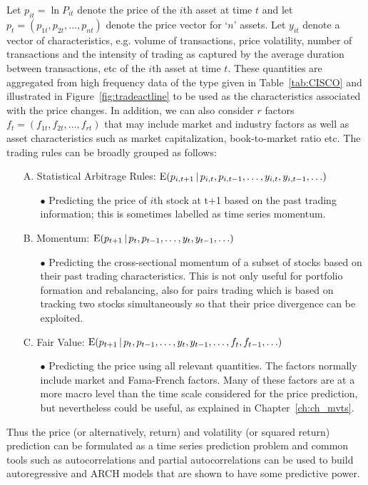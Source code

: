 Let $p_{it}= \ln P_{it}$ denote the price of the $i$th asset at time $t$ and let $p_t = (p_{1t}, p_{2t}, \ldots, p_{nt})$ denote the price vector for `$n$' assets. Let $y_{it}$ denote a vector of characteristics, e.g. volume of transactions, price volatility, number of transactions and the intensity of trading as captured by the average duration between transactions, etc of the $i$th asset at time $t$. These quantities are aggregated from high frequency data of the type given in Table~\ref{tab:CISCO} and illustrated in Figure~\ref{fig:tradeactline} to be used as the characteristics associated with the price changes. In addition, we can also consider $r$ factors $f_t = (f_{1t}, f_{2t}, \ldots, f_{rt})$ that may include market and industry factors as well as asset characteristics such as market capitalization, book-to-market ratio etc. The trading rules can be broadly grouped as follows:
        \begin{itemize}
        \item[A.] Statistical Arbitrage Rules: $\operatorname{E}(p_{i,t+1}\,|\,p_{i,t},p_{i,t-1},\ldots,y_{i,t},y_{i,t-1},\ldots)$
        \begin{itemize}
        \item[$\bullet$] Predicting the price of $i$th stock at t+1 based on the past trading information; this is sometimes labelled as time series momentum.
        \end{itemize}
        \item[B.] Momentum: $\operatorname{E}(p_{t+1}\,|\,p_{t},p_{t-1},\ldots,y_{t},y_{t-1},\ldots)$
        \begin{itemize}
        \item[$\bullet$] Predicting the cross-sectional momentum of a subset of stocks based on their past trading characteristics. This is not only useful for portfolio formation and rebalancing, also for pairs trading which is based on tracking two stocks simultaneously so that their price divergence can be exploited. 
        \end{itemize}
        \item[C.] Fair Value: $\operatorname{E}(p_{t+1}\,|\,p_{t},p_{t-1},\ldots,y_{t},y_{t-1},\ldots,f_t,f_{t-1},\ldots)$
        \begin{itemize}
        \item[$\bullet$] Predicting the price using all relevant quantities. The factors normally include market and Fama-French factors. Many of these factors are at a more macro level than the time scale considered for the price prediction, but nevertheless could be useful, as explained in Chapter~\ref{ch:ch_mvts}.
        \end{itemize}
        \end{itemize}
\noindent Thus the price (or alternatively, return) and volatility (or squared return) prediction can be formulated as a time series prediction problem and common tools such as autocorrelations and partial autocorrelations can be used to build autoregressive and ARCH models that are shown to have some predictive power. 


